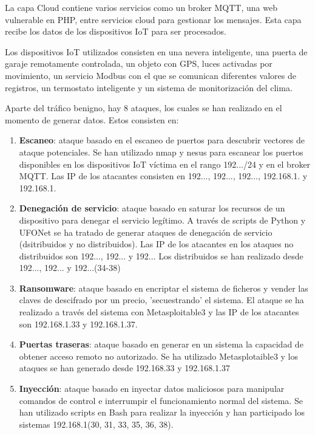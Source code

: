 La capa Cloud contiene varios servicios como un broker MQTT, una web vulnerable en PHP, entre servicios cloud para gestionar los mensajes. Esta capa recibe los datos de los dispositivos IoT para ser procesados.

Los dispositivos IoT utilizados consisten en una nevera inteligente, una puerta de garaje remotamente controlada, un objeto con GPS, luces activadas por movimiento, un servicio Modbus con el que se comunican diferentes valores de registros, un termostato inteligente y un sistema de monitorización del clima.

Aparte del tráfico benigno, hay 8 ataques, los cuales se han realizado en el momento de generar datos. Estos consisten en:
\begin{enumerate}
  \item \textbf{Escaneo}: ataque basado en el escaneo de puertos para descubrir vectores de ataque potenciales. Se han utilizado nmap y nesus para escanear los puertos disponibles en los dispositivos IoT víctima en el rango 192.../24 y en el broker MQTT. Las IP de los atacantes consisten en 192..., 192..., 192..., 192.168.1. y 192.168.1.
  \item \textbf{Denegación de servicio}: ataque basado en saturar los recursos de un dispositivo para denegar el servicio legítimo. A través de scripts de Python y UFONet se ha tratado de generar ataques de denegación de servicio (dsitribuidos y no distribuidos). Las IP de los atacantes en los ataques no distribuidos son 192..., 192... y 192... Los distribuidos se han realizado desde 192..., 192... y 192...\-(34-38)
  \item \textbf{Ransomware}: ataque basado en encriptar el sistema de ficheros y vender las claves de descifrado por un precio, 'secuestrando' el sistema. El ataque se ha realizado a través del sistema con Metasploitable3 y las IP de los atacantes son 192.168.1.33 y 192.168.1.37.
  \item \textbf{Puertas traseras}: ataque basado en generar en un sistema la capacidad de obtener acceso remoto no autorizado. Se ha utilizado Metasplotaible3 y los ataques se han generado desde 192.168.33 y 192.168.1.37
  \item \textbf{Inyección}: ataque basado en inyectar datos maliciosos para manipular comandos de control e interrumpir el funcionamiento normal del sistema. Se han utilizado scripts en Bash para realizar la inyección y han participado los sistemas 192.168.1(30, 31, 33, 35, 36, 38).

\end{enumerate}
